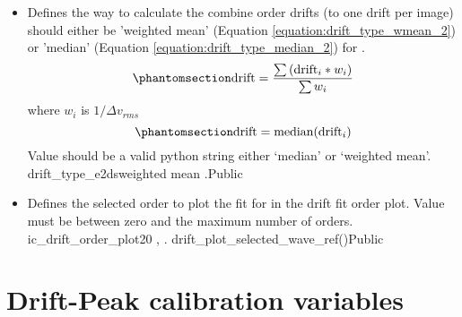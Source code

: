 \begin{itemize}
\item {}
{Defines the way to calculate the combine order drifts (to one drift per image) should either be 'weighted mean' (Equation \ref{equation:drift_type_wmean_2}) or 'median' (Equation \ref{equation:drift_type_median_2}) for \calDRIFTE.
\begin{equation}
\namedlabel{equation:drift_type_wmean_2}
\text{drift} = \frac{\sum{(\text{drift}_i * w_i)}}{\sum{w_i}}
\end{equation}
\noindent where $w_i$ is $1/\Delta v_{rms}$
\begin{equation}
\namedlabel{equation:drift_type_median_2}
\text{drift} = \text{median}(\text{drift}_i)
\end{equation}
\noindent Value should be a valid python string either `median' or `weighted mean'.
}
{drift\_type\_e2ds}{weighted mean}
{\calDRIFTE}{\constantsfile}{\calDRIFTE.\progMAIN}{Public}

\item {}
{Defines the selected order to plot the fit for in the drift fit order plot. Value must be between zero and the maximum number of orders.}
{ic\_drift\_order\_plot}{20}
{\calDRIFTRAW, \calDRIFTE}{\constantsfile}{\spirouPlot. drift\_plot\_selected\_wave\_ref()}{Public}

\end{itemize}

\clearpage
\newpage
\section{Drift-Peak calibration variables}
\label{ch:variables:driftpeak}

